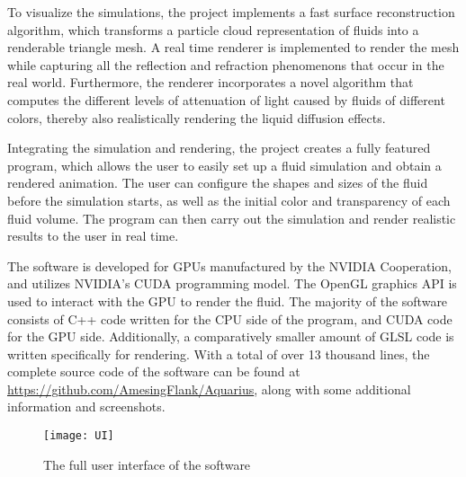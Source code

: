 To visualize the simulations, the project implements a fast surface reconstruction algorithm, which transforms a particle cloud representation of fluids into a renderable triangle mesh. A real time renderer is implemented to render the mesh while capturing all the reflection and refraction phenomenons that occur in the real world. Furthermore, the renderer incorporates a novel algorithm that computes the different levels of attenuation of light caused by fluids of different colors, thereby also realistically rendering the liquid diffusion effects. 

Integrating the simulation and rendering, the project creates a fully featured program, which allows the user to easily set up a fluid simulation and obtain a rendered animation. The user can configure the shapes and sizes of the fluid before the simulation starts, as well as the initial color and transparency of each fluid volume. The program can then carry out the simulation and render realistic results to the user in real time. 

The software is developed for GPUs manufactured by the NVIDIA Cooperation, and utilizes NVIDIA's CUDA programming model. The OpenGL graphics API is used to interact with the GPU to render the fluid. The majority of the software consists of C++ code written for the CPU side of the program, and CUDA code for the GPU side. Additionally, a comparatively smaller amount of GLSL code is written specifically for rendering. With a total of over 13 thousand lines, the complete source code of the software can be found at \url{https://github.com/AmesingFlank/Aquarius}, along with some additional information and screenshots.

\begin{figure}[H]
    \centering
        \texttt{[image: UI]}
    \caption{The full user interface of the software}
    \label{figure UI demo}
\end{figure}